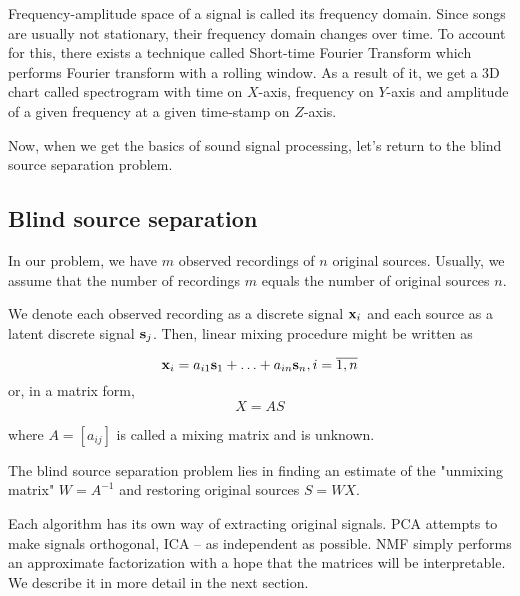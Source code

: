 \documentclass[../main.tex]{subfiles} %
\begin{document}
Frequency-amplitude space of a signal is called its frequency domain.
Since songs are usually not stationary, their frequency domain changes over time. 
To account for this, there exists a technique called Short-time Fourier Transform \cite{stft} which performs Fourier transform with a rolling window. 
As a result of it, we get a 3D chart called spectrogram with time on $X$-axis, frequency on $Y$-axis and amplitude of a given frequency at a given time-stamp on $Z$-axis.

Now, when we get the basics of sound signal processing, let's return to the blind source separation problem.

\subsection{Blind source separation}

In our problem, we have $m$ observed recordings of $n$ original sources. Usually, we assume that the number of recordings $m$ equals the number of original sources $n$.

We denote each observed recording as a discrete signal ${\mathbf x}_i$ and each source as a latent discrete signal ${\mathbf s}_j$. Then, linear mixing procedure might be written as

\[{\mathbf x}_i = a_{i1} {\mathbf s}_1 + \ldots + a_{in} {\mathbf s}_n, i = \overline{1, n}\]
or, in a matrix form,
\[X = A S\]

where $A = \left[a_{ij} \right]$ is called a mixing matrix and is unknown. 

The blind source separation problem lies in finding an estimate of the "unmixing matrix" $W = A^{-1}$  and restoring original sources $S = W X$. 

Each algorithm has its own way of extracting original signals. PCA attempts to make signals orthogonal, ICA -- as independent as possible. NMF simply performs an approximate factorization with a hope that the matrices will be interpretable. We describe it in more detail in the next section.
\end{document}
